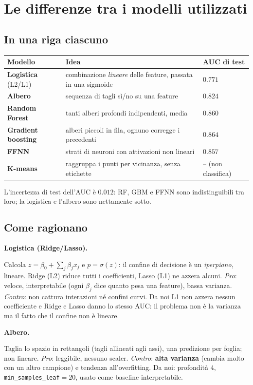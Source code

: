 \documentclass[11pt,a4paper]{article}
\newcommand{\code}[1]{\texttt{#1}}
\newcommand{\dom}[1]{\par\smallskip\noindent\textbf{#1}\par\nopagebreak}
\begin{document}
\clearpage
\section{Le differenze tra i modelli utilizzati}
\subsection*{In una riga ciascuno}
\begin{center}
\begin{tabular}{p{3.6cm}p{7.6cm}p{3.0cm}}
\toprule
Modello & Idea & AUC di test \\
\midrule
\textbf{Logistica} (L2/L1) & combinazione \emph{lineare} delle feature, passata in una sigmoide & $0.771$ \\
\textbf{Albero} & sequenza di tagli s\`i/no su una feature & $0.824$ \\
\textbf{Random Forest} & tanti alberi profondi indipendenti, media & $0.860$ \\
\textbf{Gradient boosting} & alberi piccoli in fila, ognuno corregge i precedenti & $0.864$ \\
\textbf{FFNN} & strati di neuroni con attivazioni non lineari & $0.857$ \\
\textbf{K-means} & raggruppa i punti per vicinanza, senza etichette & -- (non classifica) \\
\bottomrule
\end{tabular}
\end{center}
L'incertezza di test dell'AUC \`e $0.012$: RF, GBM e FFNN sono indistinguibili tra loro; la logistica e l'albero sono nettamente sotto.

\subsection*{Come ragionano}
\dom{Logistica (Ridge/Lasso).} Calcola $z=\beta_0+\sum_j\beta_jx_j$ e $p=\sigma(z)$: il confine di decisione \`e un \emph{iperpiano}, lineare. Ridge (L2) riduce tutti i coefficienti, Lasso (L1) ne azzera alcuni.
\emph{Pro}: veloce, interpretabile (ogni $\beta_j$ dice quanto pesa una feature), bassa varianza. \emph{Contro}: non cattura interazioni n\'e confini curvi.
Da noi L1 non azzera nessun coefficiente e Ridge e Lasso danno lo stesso AUC: il problema non \`e la varianza ma il fatto che il confine non \`e lineare.

\dom{Albero.} Taglia lo spazio in rettangoli (tagli allineati agli assi), una predizione per foglia; non lineare.
\emph{Pro}: leggibile, nessuno scaler. \emph{Contro}: \textbf{alta varianza} (cambia molto con un altro campione) e tendenza all'overfitting.
Da noi: profondit\`a $4$, \code{min\_samples\_leaf}$=20$, usato come baseline interpretabile.
\end{document}
